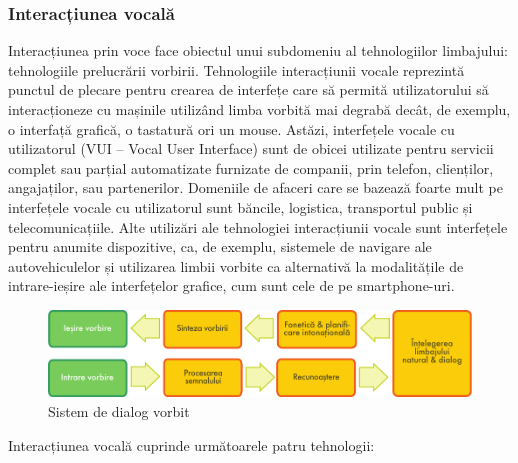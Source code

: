\begin{multicols}{2}
\subsubsection{Interacțiunea vocală}

Interacțiunea prin voce face obiectul unui subdomeniu al tehnologiilor limbajului: tehnologiile prelucrării vorbirii. Tehnologiile interacțiunii vocale reprezintă punctul de plecare pentru crearea de interfețe care să permită utilizatorului să interacționeze cu mașinile utilizând limba vorbită mai degrabă decât, de exemplu, o interfață grafică, o tastatură ori un mouse. Astăzi, interfețele vocale cu utilizatorul (VUI – Vocal User Interface) sunt de obicei utilizate pentru servicii complet sau parțial automatizate furnizate de companii, prin telefon, clienților, angajaților, sau partenerilor. Domeniile de afaceri care se bazează foarte mult pe interfețele vocale cu utilizatorul sunt băncile, logistica, transportul public și telecomunicațiile. Alte utilizări ale tehnologiei interacțiunii vocale sunt interfețele pentru anumite dispozitive, ca, de exemplu, sistemele de navigare ale autovehiculelor și utilizarea limbii vorbite ca alternativă la modalitățile de intrare-ieșire ale interfețelor grafice, cum sunt cele de pe smartphone-uri.


\begin{figure}[htb]
\center 
\includegraphics[width=\textwidth]{../_media/romanian/simple_speech-based_dialogue_architecture}
\caption{Sistem de dialog vorbit}
\label{fig:dialoguearch_de}
\end{figure}

Interacțiunea vocală cuprinde următoarele patru tehnologii:


\end{multicols}
